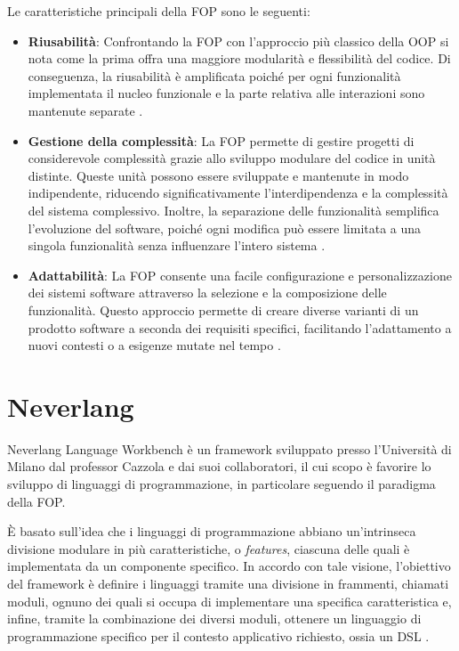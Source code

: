 \documentclass[12pt,a4paper,openright,twoside]{book}
\begin{document}
Le caratteristiche principali della \ac{FOP} sono le seguenti:
\begin{itemize}
    \item \textbf{Riusabilità}: Confrontando la \ac{FOP} con l’approccio più classico della \ac{OOP} si nota come la prima offra una maggiore 
    modularità e flessibilità del codice. Di conseguenza, la riusabilità è amplificata poiché per ogni funzionalità implementata il nucleo 
    funzionale e la parte relativa alle interazioni sono mantenute separate \cite{Prehofer1997}.
    \item \textbf{Gestione della complessità}: La \ac{FOP} permette di gestire progetti di considerevole complessità grazie allo sviluppo 
    modulare del codice in unità distinte. Queste unità possono essere sviluppate e mantenute in modo indipendente, riducendo significativamente 
    l’interdipendenza e la complessità del sistema complessivo. Inoltre, la separazione delle funzionalità semplifica l’evoluzione del software, 
    poiché ogni modifica può essere limitata a una singola funzionalità senza influenzare l’intero sistema \cite{Prehofer1997}.
    \item \textbf{Adattabilità}: La \ac{FOP} consente una facile configurazione e personalizzazione dei sistemi software attraverso la selezione 
    e la composizione delle funzionalità. Questo approccio permette di creare diverse varianti di un prodotto software a seconda dei requisiti 
    specifici, facilitando l’adattamento a nuovi contesti o a esigenze mutate nel tempo \cite{Apel2013}.
\end{itemize}

\section{Neverlang}
Neverlang Language Workbench è un framework sviluppato presso l’Università di Milano dal professor Cazzola e dai suoi collaboratori, il cui scopo 
è favorire lo sviluppo di linguaggi di programmazione, in particolare seguendo il paradigma della \ac{FOP}.

È basato sull’idea che i linguaggi di programmazione abbiano un’intrinseca divisione modulare in più caratteristiche, o \textit{features}, ciascuna 
delle quali è implementata da un componente specifico. In accordo con tale visione, l’obiettivo del framework è definire i linguaggi tramite una 
divisione in frammenti, chiamati moduli, ognuno dei quali si occupa di implementare una specifica caratteristica e, infine, tramite la combinazione 
dei diversi moduli, ottenere un linguaggio di programmazione specifico per il contesto applicativo richiesto, ossia un \ac{DSL} 
\cite{NeverlangWebsite}.
\end{document}
